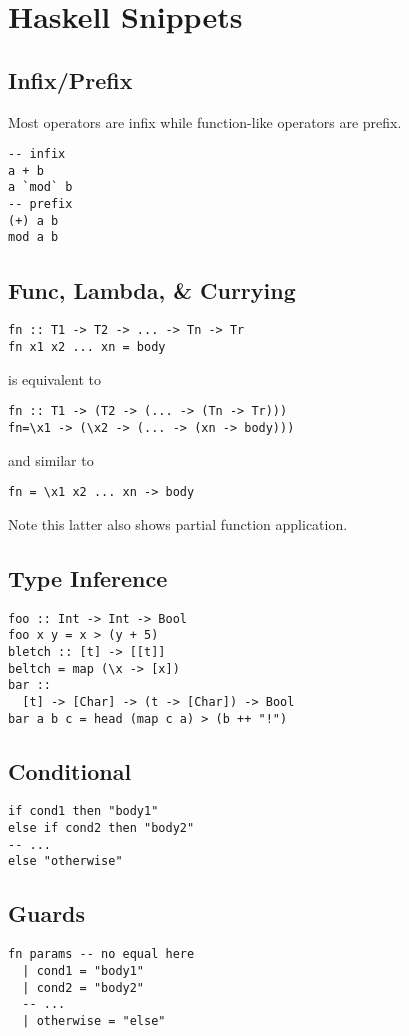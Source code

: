 \section{Haskell Snippets}
\subsection*{Infix/Prefix}
Most operators are infix while function-like operators are prefix.
\begin{verbatim}
-- infix
a + b
a `mod` b
-- prefix
(+) a b
mod a b
\end{verbatim}

\subsection*{Func, Lambda, \& Currying}
\begin{verbatim}
fn :: T1 -> T2 -> ... -> Tn -> Tr
fn x1 x2 ... xn = body
\end{verbatim}
is equivalent to
\begin{verbatim}
fn :: T1 -> (T2 -> (... -> (Tn -> Tr)))
fn=\x1 -> (\x2 -> (... -> (xn -> body)))
\end{verbatim}
and similar to
\begin{verbatim}
fn = \x1 x2 ... xn -> body
\end{verbatim}
Note this latter also shows partial function application.

\subsection*{Type Inference}
\begin{verbatim}
foo :: Int -> Int -> Bool
foo x y = x > (y + 5)
bletch :: [t] -> [[t]]
beltch = map (\x -> [x])
bar ::
  [t] -> [Char] -> (t -> [Char]) -> Bool
bar a b c = head (map c a) > (b ++ "!")
\end{verbatim}

\subsection*{Conditional}
\begin{verbatim}
if cond1 then "body1"
else if cond2 then "body2"
-- ...
else "otherwise"
\end{verbatim}

\subsection*{Guards}
\begin{verbatim}
fn params -- no equal here
  | cond1 = "body1"
  | cond2 = "body2"
  -- ...
  | otherwise = "else"
\end{verbatim}

